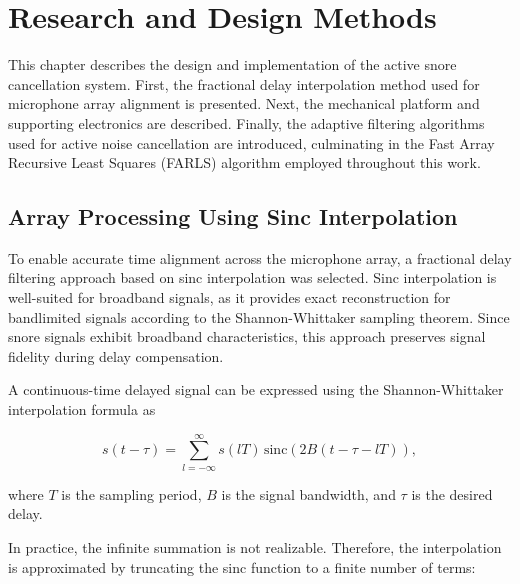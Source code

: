 %
%
%
%

\chapter{Research and Design Methods}

This chapter describes the design and implementation of the active snore cancellation system. First, the fractional delay interpolation method used for microphone array alignment is presented. Next, the mechanical platform and supporting electronics are described. Finally, the adaptive filtering algorithms used for active noise cancellation are introduced, culminating in the Fast Array Recursive Least Squares (FARLS) algorithm employed throughout this work.

\section{Array Processing Using Sinc Interpolation}

To enable accurate time alignment across the microphone array, a fractional delay filtering approach based on sinc interpolation was selected. Sinc interpolation is well-suited for broadband signals, as it provides exact reconstruction for bandlimited signals according to the Shannon-Whittaker sampling theorem. Since snore signals exhibit broadband characteristics, this approach preserves signal fidelity during delay compensation.

A continuous-time delayed signal can be expressed using the Shannon-Whittaker interpolation formula as

\begin{equation}
s(t - \tau) = \sum_{l=-\infty}^{\infty} s(lT) \, \text{sinc}\left(2B(t - \tau - lT)\right),
\end{equation}

where $T$ is the sampling period, $B$ is the signal bandwidth, and $\tau$ is the desired delay.

In practice, the infinite summation is not realizable. Therefore, the interpolation is approximated by truncating the sinc function to a finite number of terms:

